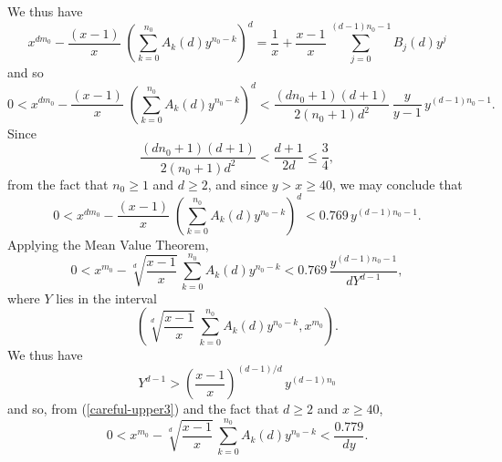  We thus have
\begin{equation} \label{careful}
 x^{d m_0} -  \frac{(x-1)}{x} \; \left( \sum_{k = 0}^{n_0} A_k (d) y^{n_0-k} \right)^d = \frac{1}{x} + \frac{x-1}{x} \, \sum_{j=0}^{(d-1)n_0-1} B_j(d) y^j
 \end{equation}
 and so
 \begin{equation} \label{careful-upper}
 0 <  x^{d m_0} -  \frac{(x-1)}{x} \; \left( \sum_{k = 0}^{n_0} A_k (d) y^{n_0-k} \right)^d <  \frac{(dn_0+1)(d+1)}{2 (n_0+1) d^2} \, \frac{y}{y-1} \, y^{(d-1) n_0-1}.
 \end{equation}
 Since
 $$
 \frac{(dn_0+1)(d+1)}{2 (n_0+1) d^2} < \frac{d+1}{2d} \leq \frac{3}{4},
 $$
from the fact that $n_0 \geq 1$ and $d \geq 2$, and since $y > x \geq 40$, we may conclude that
  \begin{equation} \label{careful-upper2}
 0 <  x^{d m_0} -  \frac{(x-1)}{x} \; \left( \sum_{k = 0}^{n_0} A_k (d) y^{n_0-k} \right)^d < 0.769 \, y^{(d-1) n_0-1}.
 \end{equation}
 Applying the Mean Value Theorem,
  \begin{equation} \label{careful-upper3}
 0 <   x^{m_0} -  \sqrt[d]{\frac{x-1}{x}} \, \sum_{k = 0}^{n_0} A_k (d) y^{n_0-k}  <  0.769 \,  \frac{y^{(d-1) n_0-1}}{d Y^{d-1}},
  \end{equation}
  where $Y$ lies in the interval
  $$
  \left( \sqrt[d]{\frac{x-1}{x}} \, \sum_{k = 0}^{n_0} A_k (d) y^{n_0-k}, x^{m_0} \right).
  $$
 We thus have
 $$
 Y^{d-1} >  \left( \frac{x-1}{x} \right)^{(d-1)/d} \, y^{(d-1) n_0}
 $$
 and so, from (\ref{careful-upper3}) and the fact that $d \geq 2$ and $x \geq 40$, 
   \begin{equation} \label{careful-upper4}
 0 <   x^{m_0} -  \sqrt[d]{\frac{x-1}{x}} \, \sum_{k = 0}^{n_0} A_k (d) y^{n_0-k}  <  \frac{0.779}{d y}.
  \end{equation}
  
